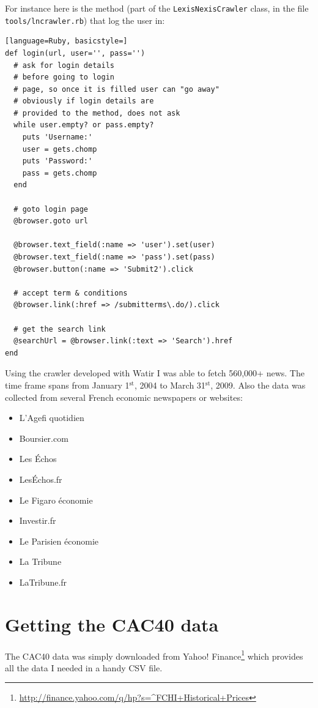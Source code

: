 \documentclass[12pt]{report}
\newcommand{\superscript}[1]{\ensuremath{^{\textrm{#1}}}}
\newcommand{\st}[0]{\superscript{st}}
\begin{document}
For instance here is the method (part of the \lstinline!LexisNexisCrawler! class, in the file \lstinline!tools/lncrawler.rb!) that log the user in:

\begin{lstlisting}[language=Ruby, basicstyle=]
def login(url, user='', pass='')
  # ask for login details
  # before going to login
  # page, so once it is filled user can "go away"
  # obviously if login details are
  # provided to the method, does not ask
  while user.empty? or pass.empty?
    puts 'Username:'
    user = gets.chomp
    puts 'Password:'
    pass = gets.chomp
  end

  # goto login page
  @browser.goto url

  @browser.text_field(:name => 'user').set(user)
  @browser.text_field(:name => 'pass').set(pass)
  @browser.button(:name => 'Submit2').click

  # accept term & conditions
  @browser.link(:href => /submitterms\.do/).click

  # get the search link
  @searchUrl = @browser.link(:text => 'Search').href
end
\end{lstlisting}

Using the crawler developed with Watir I was able to fetch 560,000+ news. The time frame spans from January 1\st, 2004 to March 31\st, 2009. Also the data was collected from several French economic newspapers or websites:
\begin{itemize}
	\item L'Agefi quotidien
	\item Boursier.com
	\item Les \'Echos
	\item Les\'Echos.fr
	\item Le Figaro économie
	\item Investir.fr
	\item Le Parisien économie
	\item La Tribune
	\item LaTribune.fr
\end{itemize}

\section{Getting the CAC40 data}

The CAC40 data was simply downloaded from Yahoo! Finance\footnote{\url{http://finance.yahoo.com/q/hp?s=^FCHI+Historical+Prices}} which provides all the data I needed in a handy  CSV file.
\end{document}
